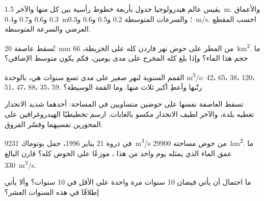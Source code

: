 \begin{exercise}[$\star\star$]\label{exo:g10:drainage-basins:6}
يقيس عالم هيدرولوجيا  جدول بأربعة خطوط رأسية بين كل منها والآخر \qty{1.5}{m}.
والأعماق \num{0.3} و\num{0.6} و\num{0.7} و\qty{0.4}{m}؛ والسرعات المتوسطة
\num{0.2} و\num{0.5} و\num{0.6} و\qty{0.3}{m/s}. احسب
المقطع العرضي  والسرعة المتوسطة.
\end{exercise}

\begin{exercise}[$\star\star$]\label{exo:g10:drainage-basins:7}
تُسقط عاصفة \qty{20}{mm} من المطر على حوض نهر فاردن كله
على الخريطة، \qty{66}{km^2}. ما حجم هذا الماء؟ وإذا بلغ كله المخرج على مدى يومين،
فكم يكون متوسط  الإضافي؟
\end{exercise}

\begin{exercise}[$\star\star$]\label{exo:g10:drainage-basins:8}
القمم السنوية لنهر صغير على مدى تسع سنوات هي، بالوحدة \unit{m^3/s}:
\num{42}، \num{65}، \num{38}، \num{120}، \num{51}، \num{47}، \num{88}،
\num{35}، \num{59}. رتّبها وأعطِ  أكبر
ثلاث منها. وما  القمة الوسيطة؟
\end{exercise}

\begin{exercise}[$\star\star$]\label{exo:g10:drainage-basins:9}
تسقط العاصفة نفسها على حوضين متساويين في المساحة: أحدهما شديد الانحدار تغطيه
بلدة، والآخر لطيف الانحدار مكسو بالغابات. ارسم تخطيطيًا الهيدروغرافين
على المحورين نفسيهما وفسّر الفروق.
\end{exercise}

\begin{exercise}[$\star\star$]\label{exo:g10:drainage-basins:10}
في ذروة 21 يناير 1996، حمل بوتوماك \qty{9231}{m^3/s} من
حوض مساحته \qty{29900}{km^2}. ما عمق الماء الذي يمثله يوم واحد من هذا ،
موزعًا على الحوض كله؟ قارن  البالغ
\qty{330}{m^3/s}.
\end{exercise}

\begin{exercise}[$\star\star$]\label{exo:g10:drainage-basins:11}
ما احتمال أن يأتي فيضان  \num{10} سنوات مرة واحدة على الأقل في
\num{10} سنوات؟ وألا يأتي إطلاقًا في هذه السنوات العشر؟
\end{exercise}

